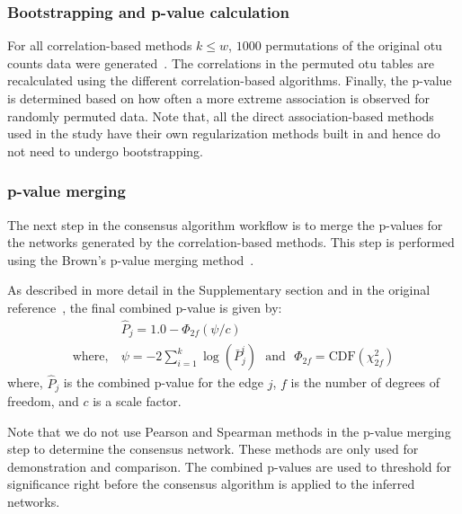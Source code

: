   \subsubsection*{Bootstrapping and p-value calculation}
  \vspace{-5mm}
  For all correlation-based methods $k \le w$, $1000$ permutations of the original \ac{otu} counts data were generated~\cite{Watts2018}.
  The correlations in the permuted \ac{otu} tables are recalculated using the different correlation-based algorithms.
  Finally, the p-value is determined based on how often a more extreme association is observed for randomly permuted data.
  Note that, all the direct association-based methods used in the study have their own regularization methods built in and hence do not need to undergo bootstrapping.

  \subsubsection*{p-value merging}
  \vspace{-5mm}
  The next step in the consensus algorithm workflow is to merge the p-values for the networks generated by the correlation-based methods.
  This step is performed using the Brown's p-value merging method~\cite{Poole_Gibbs_Shmulevich_Bernard_Knijnenburg_2016,faustCoNetAppInference2016}.

  As described in more detail in the Supplementary section and in the original reference~\cite{Poole_Gibbs_Shmulevich_Bernard_Knijnenburg_2016}, the final combined p-value is given by:
  \begin{equation}
    \begin{aligned}
        & \hat{P}_j = 1.0 - \Phi_{2f}\left( \psi / c \right) \\
        \text{where},~ &\psi = -2 \sum_{i=1}^k \log(\bar{P}^i_j) ~~~\text{and}~~~ \Phi_{2f} = \mathrm{CDF}\left( \chi^2_{2f} \right)
    \end{aligned}
    \label{eqn:pvalue-combined}
  \end{equation}
  where, $\hat{P}_j$ is the combined p-value for the edge $j$, $f$ is the number of degrees of freedom, and $c$ is a scale factor.

  Note that we do not use Pearson and Spearman methods in the p-value merging step to determine the consensus network.
  These methods are only used for demonstration and comparison.
  The combined p-values are used to threshold for significance right before the consensus algorithm is applied to the inferred networks.

